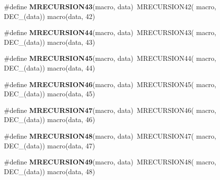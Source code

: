 \begin{DoxyCompactItemize}
\item 
\hypertarget{group__group__sam0__utils__mrecursion_ga33387af8b5d03268b41df40ecb0523db}{}\#define {\bfseries M\+R\+E\+C\+U\+R\+S\+I\+O\+N43}(macro,  data)~M\+R\+E\+C\+U\+R\+S\+I\+O\+N42(  macro, D\+E\+C\+\_\+(data))   macro(data, 42)\label{group__group__sam0__utils__mrecursion_ga33387af8b5d03268b41df40ecb0523db}

\item 
\hypertarget{group__group__sam0__utils__mrecursion_gaf2833cdb0675c88cbd9f2ba45d2f7f44}{}\#define {\bfseries M\+R\+E\+C\+U\+R\+S\+I\+O\+N44}(macro,  data)~M\+R\+E\+C\+U\+R\+S\+I\+O\+N43(  macro, D\+E\+C\+\_\+(data))   macro(data, 43)\label{group__group__sam0__utils__mrecursion_gaf2833cdb0675c88cbd9f2ba45d2f7f44}

\item 
\hypertarget{group__group__sam0__utils__mrecursion_ga6c44b77fa83c21cc22ccaf63ccf61ce9}{}\#define {\bfseries M\+R\+E\+C\+U\+R\+S\+I\+O\+N45}(macro,  data)~M\+R\+E\+C\+U\+R\+S\+I\+O\+N44(  macro, D\+E\+C\+\_\+(data))   macro(data, 44)\label{group__group__sam0__utils__mrecursion_ga6c44b77fa83c21cc22ccaf63ccf61ce9}

\item 
\hypertarget{group__group__sam0__utils__mrecursion_ga15da6fe5b481385cb81447562e307e67}{}\#define {\bfseries M\+R\+E\+C\+U\+R\+S\+I\+O\+N46}(macro,  data)~M\+R\+E\+C\+U\+R\+S\+I\+O\+N45(  macro, D\+E\+C\+\_\+(data))   macro(data, 45)\label{group__group__sam0__utils__mrecursion_ga15da6fe5b481385cb81447562e307e67}

\item 
\hypertarget{group__group__sam0__utils__mrecursion_ga5a7b09aafde0d0218dd81631ea9b8063}{}\#define {\bfseries M\+R\+E\+C\+U\+R\+S\+I\+O\+N47}(macro,  data)~M\+R\+E\+C\+U\+R\+S\+I\+O\+N46(  macro, D\+E\+C\+\_\+(data))   macro(data, 46)\label{group__group__sam0__utils__mrecursion_ga5a7b09aafde0d0218dd81631ea9b8063}

\item 
\hypertarget{group__group__sam0__utils__mrecursion_gaf338c8087c63ca31cb23b9502cf53a81}{}\#define {\bfseries M\+R\+E\+C\+U\+R\+S\+I\+O\+N48}(macro,  data)~M\+R\+E\+C\+U\+R\+S\+I\+O\+N47(  macro, D\+E\+C\+\_\+(data))   macro(data, 47)\label{group__group__sam0__utils__mrecursion_gaf338c8087c63ca31cb23b9502cf53a81}

\item 
\hypertarget{group__group__sam0__utils__mrecursion_ga6b1985491fecb7655f97651ce16eb3c0}{}\#define {\bfseries M\+R\+E\+C\+U\+R\+S\+I\+O\+N49}(macro,  data)~M\+R\+E\+C\+U\+R\+S\+I\+O\+N48(  macro, D\+E\+C\+\_\+(data))   macro(data, 48)\label{group__group__sam0__utils__mrecursion_ga6b1985491fecb7655f97651ce16eb3c0}


\end{DoxyCompactItemize}
